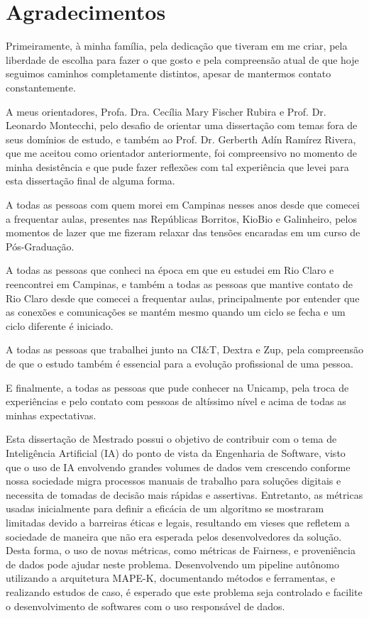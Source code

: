 \documentclass[portugues]{ic-tese}
\begin{document}
\chapter{Agradecimentos}
Primeiramente, à minha família, pela dedicação que tiveram em me criar, pela liberdade de escolha para fazer o que gosto e pela compreensão atual de que hoje seguimos caminhos completamente distintos, apesar de mantermos contato constantemente.

A meus orientadores, Profa. Dra. Cecília Mary Fischer Rubira e Prof. Dr. Leonardo Montecchi, pelo desafio de orientar uma dissertação com temas fora de seus domínios de estudo, e também ao Prof. Dr. Gerberth Adín Ramírez Rivera, que me aceitou como orientador anteriormente, foi compreensivo no momento de minha desistência e que pude fazer reflexões com tal experiência que levei para esta dissertação final de alguma forma.

A todas as pessoas com quem morei em Campinas nesses anos desde que comecei a frequentar aulas, presentes nas Repúblicas Borritos, KioBio e Galinheiro, pelos momentos de lazer que me fizeram relaxar das tensões encaradas em um curso de Pós-Graduação.

A todas as pessoas que conheci na época em que eu estudei em Rio Claro e reencontrei em Campinas, e também a todas as pessoas que mantive contato de Rio Claro desde que comecei a frequentar aulas, principalmente por entender que as conexões e comunicações se mantém mesmo quando um ciclo se fecha e um ciclo diferente é iniciado.

A todas as pessoas que trabalhei junto na CI\&T, Dextra e Zup, pela compreensão de que o estudo também é essencial para a evolução profissional de uma pessoa.

E finalmente, a todas as pessoas que pude conhecer na Unicamp, pela troca de experiências e pelo contato com pessoas de altíssimo nível e acima de todas as minhas expectativas.

\begin{resumo}
Esta dissertação de Mestrado possui o objetivo de contribuir com o tema de Inteligência Artificial (IA) do ponto de vista da Engenharia de Software, visto que o uso de IA envolvendo grandes volumes de dados vem crescendo conforme nossa sociedade migra processos manuais de trabalho para soluções digitais e necessita de tomadas de decisão mais rápidas e assertivas. Entretanto, as métricas usadas inicialmente para definir a eficácia de um algoritmo se mostraram limitadas devido a barreiras éticas e legais, resultando em vieses que refletem a sociedade de maneira que não era esperada pelos desenvolvedores da solução. Desta forma, o uso de novas métricas, como métricas de Fairness, e proveniência de dados pode ajudar neste problema. Desenvolvendo um pipeline autônomo utilizando a arquitetura MAPE-K, documentando métodos e ferramentas, e realizando estudos de caso, é esperado que este problema seja controlado e facilite o desenvolvimento de softwares com o uso responsável de dados.
\end{resumo}
\end{document}
